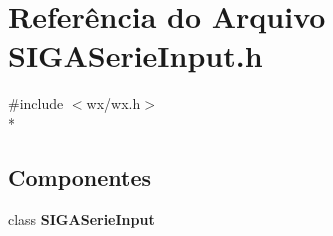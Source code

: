 \section{Referência do Arquivo S\+I\+G\+A\+Serie\+Input.\+h}
\label{_s_i_g_a_serie_input_8h}
{\ttfamily \#include $<$wx/wx.\+h$>$}\\*
\subsection*{Componentes}
\begin{DoxyCompactItemize}
\item 
class {\bf S\+I\+G\+A\+Serie\+Input}
\end{DoxyCompactItemize}
